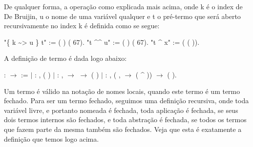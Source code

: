  De qualquer forma, a operação como explicada mais acima, onde k é o index de De Bruijin,
u o nome de uma variável qualquer e t o pré-termo que será aberto recursivamente no index k é 
definida como se segue:\begin{coqdoccode}
\coqdocemptyline
\coqdocnoindent
{} "\{ k \~{}> u \} t" := (   ) (  67).\coqdoceol
\coqdocemptyline
\coqdocnoindent
{} "t \^{}\^{} u" := (  ) (  67).\coqdoceol
\coqdocnoindent
{} "t \^{} x" := (  ( )).\coqdoceol
\coqdocemptyline
\coqdocemptyline
\end{coqdoccode}
A definição de termo é dada logo abaixo:\begin{coqdoccode}
\coqdocemptyline
\coqdocnoindent
{}  :  \ensuremath{\rightarrow}  :=\coqdoceol
\coqdocindent{1.00em}
\ensuremath{|}  : \coqdockw{\ensuremath{\forall}} ,\coqdoceol
\coqdocindent{3.00em}
 ( )\coqdoceol
\coqdocindent{1.00em}
\ensuremath{|}  : \coqdockw{\ensuremath{\forall}}  ,\coqdoceol
\coqdocindent{3.00em}
  \ensuremath{\rightarrow} \coqdoceol
\coqdocindent{3.00em}
  \ensuremath{\rightarrow} \coqdoceol
\coqdocindent{3.00em}
 (  )\coqdoceol
\coqdocindent{1.00em}
\ensuremath{|}  : \coqdockw{\ensuremath{\forall}}  ,\coqdoceol
\coqdocindent{3.00em}
(\coqdockw{\ensuremath{\forall}} ,    \ensuremath{\rightarrow}  ( \^{} )) \ensuremath{\rightarrow}\coqdoceol
\coqdocindent{3.00em}
 ( ).\coqdoceol
\coqdocemptyline
\end{coqdoccode}
Um termo é válido na notação de nomes locais, quando este termo é um termo fechado. 
Para ser um termo fechado, seguimos uma definição recursiva, onde toda variável livre, e portanto
nomeada é fechada, toda aplicação é fechada, se seus dois termos internos são fechados, e toda
abstração é fechada, se todos os termos que fazem parte da mesma também são fechados. Veja que esta é
exatamente a definição que temos logo acima.

